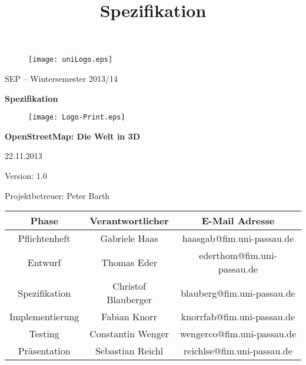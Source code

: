 \documentclass[10pt]{scrreprt}
\begin{document}
\thispagestyle{empty}
\sffamily
 
\title{Spezifikation}

\begin{figure}
\begin{flushright}
	\texttt{[image: uniLogo.eps]}
\vspace{2.0 cm}
\end{flushright}
\end{figure}

\begin{center}
\vspace{2.0 cm}
{\LARGE SEP – Wintersemester 2013/14}

\vspace{1.0 cm}
\textbf{{\Huge Spezifikation}}

\vspace{0.4 cm}
\begin{figure}[!htb]
\begin{center}
	\texttt{[image: Logo-Print.eps]}
\end{center}
\end{figure}

\vspace{0.2 cm}
\textbf{{\huge OpenStreetMap: Die Welt in 3D}}

\vspace{1.5 cm}
22.11.2013

\vspace{0.5 cm}
Version: 1.0

\vspace{1.5 cm}
{\Large Projektbetreuer: Peter Barth}

\vspace{1.5 cm}
\begin{tabular}{|c|c|c|}
\hline 
\rule[-1ex]{0pt}{4ex} \textbf{Phase} & \textbf{Verantwortlicher} & \textbf{E-Mail Adresse} \\ 
\hline  \hline
\rule[-1ex]{0pt}{4ex} Pflichtenheft & Gabriele Haas & haasgab@fim.uni-passau.de \\ 
\hline  \hline
\rule[-1ex]{0pt}{4ex} Entwurf & Thomas Eder & ederthom@fim.uni-passau.de \\ 
\hline  \hline
\rule[-1ex]{0pt}{4ex} Spezifikation & Christof Blauberger & blauberg@fim.uni-passau.de \\ 
\hline  \hline
\rule[-1ex]{0pt}{4ex} Implementierung & Fabian Knorr & knorrfab@fim.uni-passau.de \\ 
\hline \hline 
\rule[-1ex]{0pt}{4ex} Testing & Constantin Wenger & wengerco@fim.uni-passau.de \\ 
\hline  \hline
\rule[-1ex]{0pt}{4ex} Präsentation & Sebastian Reichl & reichlse@fim.uni-passau.de \\ 
\hline 
\end{tabular}

\end{center}
\end{document}
